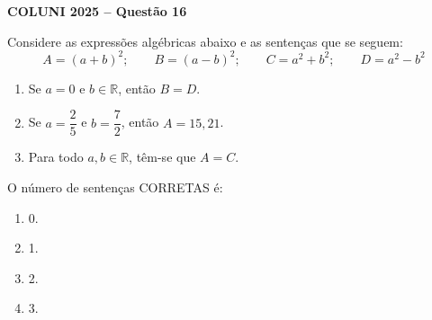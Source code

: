 \textbf{COLUNI 2025 -- Questão 16}\par\medskip Considere as expressões algébricas abaixo e as sentenças que se seguem:
\[
A=(a+b)^2;\qquad B=(a-b)^2;\qquad C=a^2+b^2;\qquad D=a^2-b^2
\]
\begin{enumerate}
\item[I.] Se $a=0$ e $b\in\mathbb{R}$, então $B=D$.
\item[II.] Se $a=\dfrac25$ e $b=\dfrac72$, então $A=15,21$.
\item[III.] Para todo $a,b\in\mathbb{R}$, têm-se que $A=C$.
\end{enumerate}
O número de sentenças CORRETAS é:
\begin{enumerate}
\item 0.
\item 1.
\item 2.
\item 3.
\end{enumerate}
